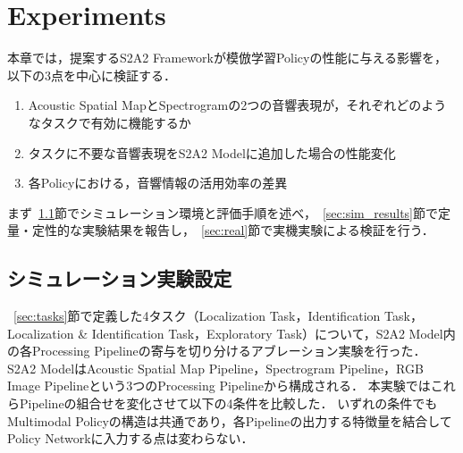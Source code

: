 \documentclass{article}
\begin{document}









\section{Experiments}
\label{sec:result}
	本章では，提案するS2A2 Frameworkが模倣学習Policyの性能に与える影響を，以下の3点を中心に検証する．
	\begin{enumerate}
		\item Acoustic Spatial MapとSpectrogramの2つの音響表現が，それぞれどのようなタスクで有効に機能するか
		\item タスクに不要な音響表現をS2A2 Modelに追加した場合の性能変化
		\item 各Policyにおける，音響情報の活用効率の差異
	\end{enumerate}

	まず~\ref{sec:sim_setup}節でシミュレーション環境と評価手順を述べ，~\ref{sec:sim_results}節で定量・定性的な実験結果を報告し，~\ref{sec:real}節で実機実験による検証を行う．

\subsection{シミュレーション実験設定}
\label{sec:sim_setup}
	~\ref{sec:tasks}節で定義した4タスク（Localization Task，Identification Task，Localization \& Identification Task，Exploratory Task）について，S2A2 Model内の各Processing Pipelineの寄与を切り分けるアブレーション実験を行った．
	S2A2 ModelはAcoustic Spatial Map Pipeline，Spectrogram Pipeline，RGB Image Pipelineという3つのProcessing Pipelineから構成される．
	本実験ではこれらPipelineの組合せを変化させて以下の4条件を比較した．
	いずれの条件でもMultimodal Policyの構造は共通であり，各Pipelineの出力する特徴量を結合してPolicy Networkに入力する点は変わらない．
\end{document}
